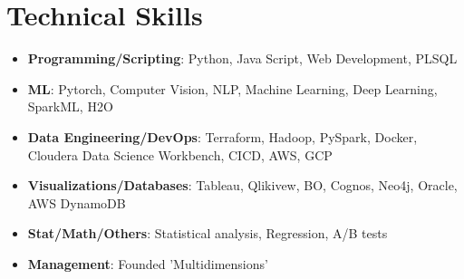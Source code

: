 \documentclass[letterpaper,11pt]{article}
\newcommand{\resumeItem}[2]{
  \item\small{
    \textbf{#1}{: #2 \vspace{-2pt}}
    }
  }
\newcommand{\resumeSubItem}[2]{\resumeItem{#1}{#2}\vspace{-4pt}}
\newcommand{\resumeSubHeadingListStart}{\begin{itemize}[leftmargin=*]}
\newcommand{\resumeSubHeadingListEnd}{\end{itemize}}
\begin{document}
          \section{Technical Skills}
        \resumeSubHeadingListStart
        \resumeSubItem{Programming/Scripting}
        {Python, Java Script, Web Development, PLSQL}
        \resumeSubItem{ML}
        {Pytorch, Computer Vision, NLP, Machine Learning, Deep Learning, SparkML, H2O}
        \resumeSubItem{Data Engineering/DevOps}
        {Terraform, Hadoop, PySpark, Docker, Cloudera Data Science Workbench, CICD, AWS, GCP}
        \resumeSubItem{Visualizations/Databases}
        {Tableau, Qlikivew, BO, Cognos, Neo4j, Oracle, AWS DynamoDB}
        \resumeSubItem{Stat/Math/Others}
        {Statistical analysis, Regression, A/B tests}
                \resumeSubItem{Management}
        {Founded 'Multidimensions'}

        \resumeSubHeadingListEnd
        
        
        
          
\end{document}

